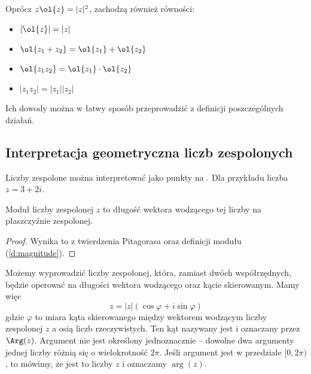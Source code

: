 \begin{lemma}
    Oprócz $z\ol{z} = |z|^2$, zachodzą również równości:
    \begin{itemize}
        \item $|\ol{z}| = |z|$
        \item $\ol{z_1 + z_2} = \ol{z_1} + \ol{z_2}$
        \item $\ol{z_1z_2} = \ol{z_1}\cdot\ol{z_2}$
        \item $|z_1z_2| = |z_1||z_2|$
    \end{itemize}
\end{lemma}
Ich dowody można w łatwy sposób przeprowadzić z definicji poszczególnych działań.

\subsection{Interpretacja geometryczna liczb zespolonych}
Liczby zespolone można interpretować jako punkty na . Dla przykładu liczba $z = 3 + 2i$.

\begin{center}
\end{center}

\begin{fact}
    Moduł liczby zespolonej $z$ to długość wektora wodzącego tej liczby na płaszczyźnie zespolonej.
\end{fact}
\begin{proof}
    Wynika to z twierdzenia Pitagorasa oraz definicji modułu (\ref{d:magnitude}).
\end{proof}

Możemy wyprowadzić  liczby zespolonej, która, zamiast dwóch współrzędnych, będzie operować na długości wektora wodzącego oraz kącie skierowanym. Mamy więc
$$ z = |z|(\cos\varphi + i\sin\varphi) $$
gdzie $\varphi$ to miara kąta skierowanego między wektorem wodzącym liczby zespolonej $z$ a osią liczb rzeczywistych. Ten kąt nazywany jest  i oznaczany przez $\Arg(z)$. Argument nie jest określony jednoznacznie -- dowolne dwa argumenty jednej liczby różnią się o wielokrotność $2\pi$. Jeśli argument jest w przedziale $[0, 2\pi)$, to mówimy, że jest to  liczby $z$ i oznaczamy $\arg(z)$.

